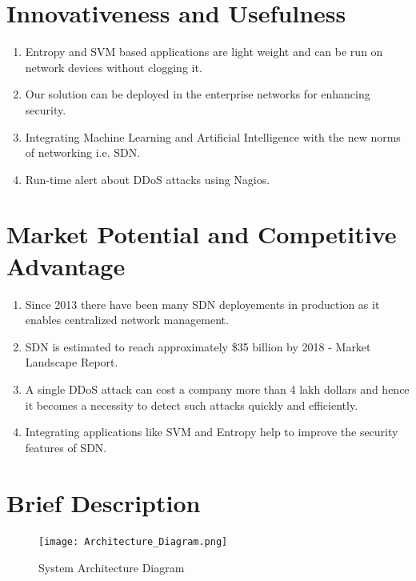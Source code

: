 \documentclass[12pt,a4paper,final]{article}
\begin{document}
\begin{flushleft}
\noindent
\section{Innovativeness and Usefulness}
\begin{enumerate}
\item
Entropy and SVM based applications are light weight and can be run on network devices without clogging it.

\item
Our solution can be deployed in the enterprise networks for enhancing security.

\item
Integrating Machine Learning and Artificial Intelligence with the new norms of networking i.e. SDN.

\item
Run-time alert about DDoS attacks using Nagios.
\end{enumerate}

\noindent
\section{Market Potential and Competitive Advantage}
\begin{enumerate}
\item
Since 2013 there have been many SDN deployements in production as it enables centralized network management.

\item
SDN is estimated to reach approximately \$35 billion by 2018 - Market Landscape Report.

\item
A single DDoS attack can cost a company more than 4 lakh dollars and hence it becomes a necessity to detect such attacks quickly and efficiently.

\item
Integrating applications like SVM and Entropy help to improve the security features of SDN.
\end{enumerate}

\noindent
\section{Brief Description}
\begin{figure}[H]
\begin{center}
\texttt{[image: Architecture\_Diagram.png]}
\caption{System Architecture Diagram}
\end{center}
\end{figure}


\end{flushleft}
\end{document}

